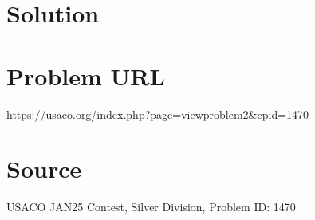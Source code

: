 \documentclass[12pt]{article}
\begin{document}
\section*{Solution}


\section*{Problem URL}
https://usaco.org/index.php?page=viewproblem2&cpid=1470

\section*{Source}
USACO JAN25 Contest, Silver Division, Problem ID: 1470
\end{document}
